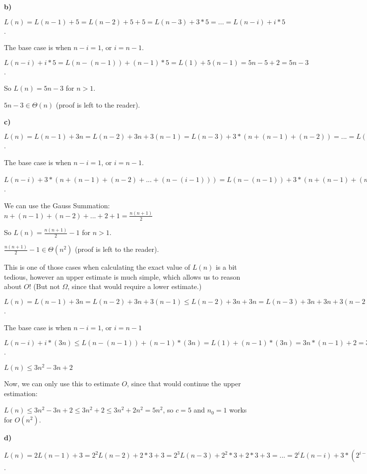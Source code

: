 \textbf{b)}

$L(n) = L(n-1) + 5 = L(n-2) + 5 + 5 = L(n-3) + 3*5 = ... = L(n-i) + i*5$.

The base case is when $n-i=1$, or $i=n-1$.

$ L(n-i) + i*5 = L(n-(n-1)) + (n-1)*5 = L(1) + 5(n-1) = 5n - 5 + 2 = 5n-3$.

So $L(n) = 5n-3$ for $n>1$.

$5n-3 \in{} \Theta(n)$ (proof is left to the reader).

\textbf{c)}

$L(n) = L(n-1) + 3n = L(n-2) + 3n + 3(n-1) = L(n-3) + 3*(n+(n-1)+(n-2)) = ... = L(n-i) + 3*(n+(n-1)+(n-2)+...+(n-(i-1)))$.

The base case is when $n-i=1$, or $i=n-1$.

$ L(n-i) + 3*(n+(n-1)+(n-2)+...+(n-(i-1))) = L(n-(n-1)) + 3*(n+(n-1)+(n-2)+...+(n-(n-1-1))) = L(1) + 3*(n+(n-1)+(n-2)+...+2) = 2 + 3*(n+(n-1)+(n-2)+...+2) = 3*(n+(n-1)+(n-2)+...+2+1)-1 = \frac{n(n+1)}{2}-1$.

We can use the Gauss Summation: $n+(n-1)+(n-2)+...+2+1 = \frac{n(n+1)}{2}$

So $L(n) = \frac{n(n+1)}{2}-1$ for $n>1$.

$\frac{n(n+1)}{2}-1 \in{} \Theta(n^2)$ (proof is left to the reader).

This is one of those cases when calculating the exact value of $L(n)$ is a bit tedious, however an upper estimate is much simple, which allows us to reason about $O$! (But not $\Omega$, since that would require a lower estimate.)

$L(n) = L(n-1) + 3n = L(n-2) + 3n + 3(n-1) \leq{} L(n-2) + 3n + 3n = L(n-3) + 3n + 3n + 3(n-2) \leq{} L(n-3) + 3*(3n) \leq{} L(n-i) + i*(3n)$.

The base case is when $n-i=1$, or $i=n-1$

$L(n-i) + i*(3n) \leq{} L(n-(n-1)) + (n-1)*(3n) = L(1) + (n-1)*(3n) = 3n*(n-1) + 2 = 3n^2-3n+2$.

$L(n) \leq{} 3n^2-3n+2$

Now, we can only use this to estimate $O$, since that would continue the upper estimation:

$L(n) \leq{} 3n^2-3n+2 \leq{} 3n^2+2 \leq{} 3n^2+2n^2 = 5n^2$, so $c=5$ and $n_0=1$ works for $O(n^2)$.

\textbf{d)}

$L(n) = 2L(n-1) + 3 = 2^2L(n-2) + 2*3 + 3 = 2^3L(n-3) + 2^2*3 + 2*3 + 3 = ... = 2^iL(n-i)+3*(2^{i-1}+...+2^0)$.

